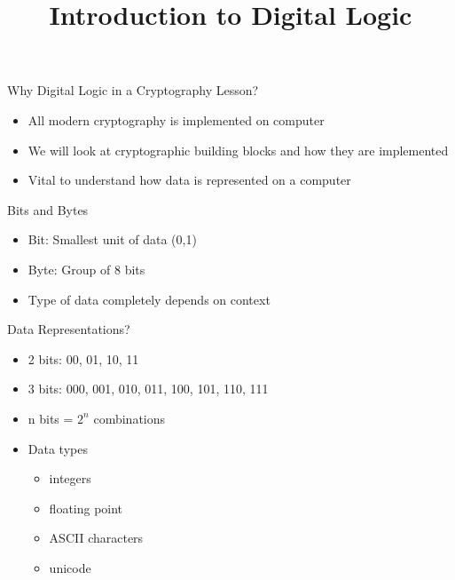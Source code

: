 

\title[]{Introduction to Digital Logic}

\begin{frame}
\titlepage
\end{frame}

\begin{withoutheadline}

\begin{frame}{Why Digital Logic in a Cryptography Lesson?}
\begin{itemize}
    \item All modern cryptography is implemented on computer
    \item We will look at cryptographic building blocks and how they are implemented
    \item Vital to understand how data is represented on a computer
\end{itemize}
\end{frame}
    
\begin{frame}{Bits and Bytes}
\begin{itemize}
    \item Bit: Smallest unit of data (0,1)
    \item Byte: Group of 8 bits
    \item Type of data completely depends on context
\end{itemize}
\end{frame}

\begin{frame}{Data Representations?}
\begin{itemize}
    \item 2 bits: 00, 01, 10, 11
    \item 3 bits: 000, 001, 010, 011, 100, 101, 110, 111
    \item n bits = $2^n$ combinations
    \item Data types
    \begin{itemize}
        \item integers
        \item floating point
        \item ASCII characters
        \item unicode
    \end{itemize}
\end{itemize}
\end{frame}


\end{withoutheadline}

